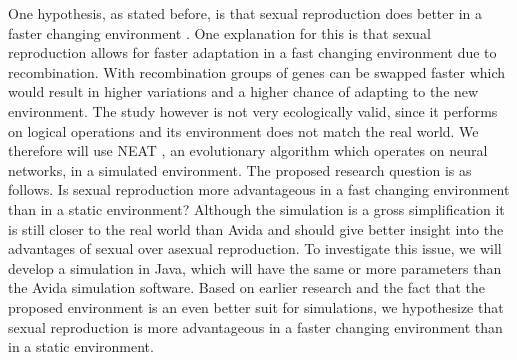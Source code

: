 One hypothesis, as stated before, is that sexual reproduction does better in a faster changing environment \cite{misevicchanging}. 
One explanation for this is that sexual reproduction allows for faster adaptation in a fast changing environment due to recombination. 
With recombination groups of genes can be swapped faster which would result in higher variations and a higher chance of adapting to the new environment.
The study however is not very ecologically valid, since it performs on logical operations and its environment does not match the real world. 
We therefore will use NEAT \cite{stanleyneat}, an evolutionary algorithm which operates on neural networks, in a simulated environment. 
The proposed research question is as follows.
Is sexual reproduction more advantageous in a fast changing environment than in a static environment?
Although the simulation is a gross simplification it is still closer to the real world than Avida and should give better insight into the advantages of sexual over asexual reproduction.
To investigate this issue, we will develop a simulation in Java, which will have the same or more parameters than the Avida simulation software.
Based on earlier research and the fact that the proposed environment is an even better suit for simulations, we hypothesize that sexual reproduction is more advantageous in a faster changing environment than in a static environment.
